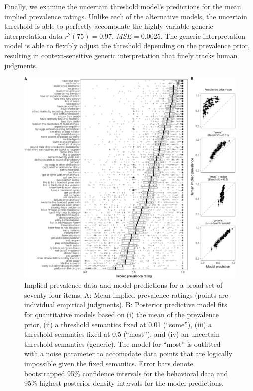 \documentclass[floatsintext,doc]{apa6}
\theoremstyle{definition}
\theoremstyle{definition}
\theoremstyle{definition}
\theoremstyle{remark}
\begin{document}
Finally, we examine the uncertain threshold model's predictions for the
mean implied prevalence ratings. Unlike each of the alternative models,
the uncertain threshold is able to perfectly accomodate the highly
variable generic interpretation data \(r^2(75) = 0.97\),
\(MSE = 0.0025\). The generic interpretation model is able to flexibly
adjust the threshold depending on the prevalence prior, resulting in
context-sensitive generic interpretation that finely tracks human
judgments.

\begin{figure}
\centering
\includegraphics{genint_files/figure-latex/genint-modelingResults-1.pdf}
\caption{\label{fig:genint-modelingResults}Implied prevalence data and model
predictions for a broad set of seventy-four items. A: Mean implied
prevalence ratings (points are individual empirical judgments). B:
Posterior predictive model fits for quantitative models based on (i) the
mean of the prevalence prior, (ii) a threshold semantics fixed at 0.01
(\enquote{some}), (iii) a threshold semantics fixed at 0.5
(\enquote{most}), and (iv) an uncertain threshold semantics (generic).
The model for \enquote{most} is outfitted with a noise parameter to
accomodate data points that are logically impossible given the fixed
semantics. Error bars denote bootstrapped 95\% confidence intervals for
the behavioral data and 95\% highest posterior density intervals for the
model predictions.}
\end{figure}
\end{document}
